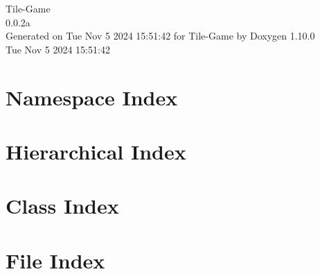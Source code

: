 \documentclass[twoside]{book}
\newcommand{\+}{\discretionary{\mbox{\scriptsize$\hookleftarrow$}}{}{}}
\newcommand{\clearemptydoublepage}{%
    \newpage{\pagestyle{empty}\cleardoublepage}%
  }
\begin{document}
  \raggedbottom
    \hypersetup{pageanchor=false,
                bookmarksnumbered=true,
                pdfencoding=unicode
               }
  \begin{titlepage}
  \vspace*{7cm}
  \begin{center}%
  {\Large Tile-\/\+Game}\\
  [1ex]\large 0.\+0.\+2a \\
  \vspace*{1cm}
  {\large Generated on Tue Nov 5 2024 15\+:51\+:42 for Tile-\/\+Game by Doxygen 1.10.0}\\
    \vspace*{0.5cm}
    {\small Tue Nov 5 2024 15:51:42}
  \end{center}
  \end{titlepage}
  \clearemptydoublepage
  \tableofcontents
  \clearemptydoublepage
  \hypersetup{pageanchor=true}
\chapter{Namespace Index}

\chapter{Hierarchical Index}

\chapter{Class Index}

\chapter{File Index}

\end{document}
